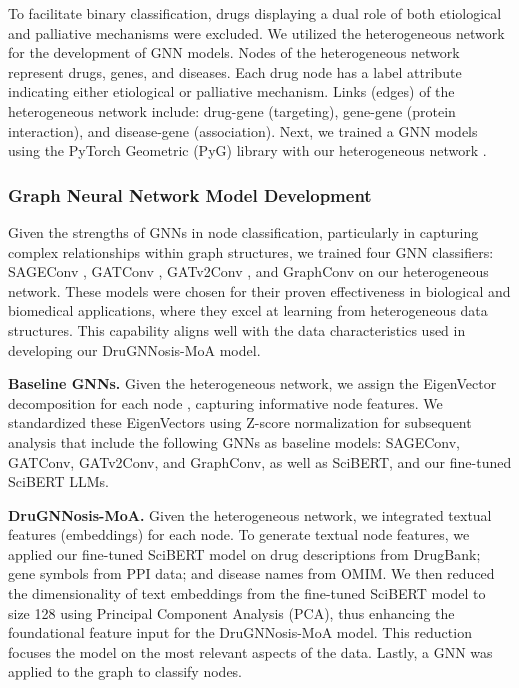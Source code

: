 \documentclass[journal,twoside,web]{ieeecolor}
\begin{document}
To facilitate binary classification, drugs displaying a dual role of both etiological and palliative mechanisms were excluded.
We utilized the heterogeneous network for the development of GNN models.
Nodes of the heterogeneous network represent drugs, genes, and diseases.
Each drug node has a label attribute indicating either etiological or palliative mechanism.
Links (edges) of the heterogeneous network include: drug-gene (targeting), gene-gene (protein interaction), and disease-gene (association).
Next, we trained a GNN models using the PyTorch Geometric (PyG) library with our heterogeneous network \cite{Fey/Lenssen/2019}.

\subsubsection{Graph Neural Network Model Development}
\label{sec:model}
Given the strengths of GNNs in node classification, particularly in capturing complex relationships within graph structures, we trained four GNN classifiers:
SAGEConv  \cite{hamilton2017inductive}, 
GATConv \cite{velivckovic2017graph}, 
GATv2Conv  \cite{brody2021attentive}, and 
GraphConv  \cite{kipf2016semi}
on our heterogeneous network.
These models were chosen for their proven effectiveness in biological and biomedical applications, where they excel at learning from  heterogeneous data structures. 
This capability aligns well with the data characteristics used in developing our DruGNNosis-MoA model.

\textbf{Baseline GNNs.}
Given the heterogeneous network, we assign the EigenVector decomposition for each node \cite{huang2020combining}, capturing informative node features.
We standardized these EigenVectors using Z-score normalization for subsequent analysis that include the following GNNs as baseline models:
SAGEConv, GATConv, GATv2Conv, and GraphConv, as well as SciBERT, and our fine-tuned SciBERT LLMs.

\textbf{DruGNNosis-MoA.}
Given the heterogeneous network, we integrated textual features (embeddings) for each node.
To generate textual node features, we applied our fine-tuned SciBERT model on drug descriptions from DrugBank; gene symbols from PPI data; and disease names from OMIM.
We then reduced the dimensionality of text embeddings from the fine-tuned SciBERT model to size 128 using Principal Component Analysis (PCA), thus enhancing the foundational feature input for the DruGNNosis-MoA model.
This reduction focuses the model on the most relevant aspects of the data.
Lastly, a GNN was applied to the graph to classify nodes.
\end{document}
